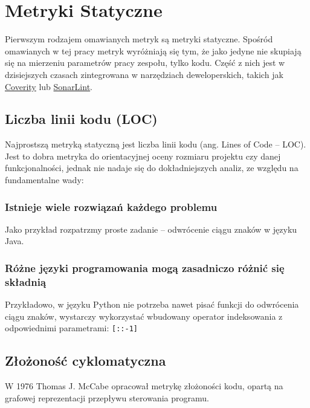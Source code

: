 \newpage
\section{Metryki Statyczne}
Pierwszym rodzajem omawianych metryk są metryki statyczne. Spośród omawianych w tej pracy metryk wyróżniają się tym,
że jako jedyne nie skupiają się na mierzeniu parametrów pracy zespołu, tylko kodu.
Część z nich jest w dzisiejszych czasach zintegrowana w narzędziach deweloperskich, takich jak \href{https://www.synopsys.com/software-integrity/static-analysis-tools-sast/coverity.html}{Coverity}
lub \href{https://www.sonarsource.com/products/sonarlint/}{SonarLint}.

\subsection{Liczba linii kodu (LOC)}
Najprostszą metryką statyczną jest liczba linii kodu (ang. Lines of Code -- LOC).
Jest to dobra metryka do orientacyjnej oceny rozmiaru projektu czy danej funkcjonalności, jednak nie nadaje
się do dokładniejszych analiz, ze względu na fundamentalne wady:

\subsubsection*{Istnieje wiele rozwiązań każdego problemu}
Jako przykład rozpatrzmy proste zadanie -- odwrócenie ciągu znaków w języku Java. \\




\subsubsection*{Różne języki programowania mogą zasadniczo różnić się składnią}
Przykładowo, w języku Python nie potrzeba nawet pisać funkcji do odwrócenia
ciągu znaków, wystarczy wykorzystać wbudowany operator indeksowania z odpowiednimi parametrami: \texttt{[::-1]}

\subsection{Złożoność cyklomatyczna}
W 1976 Thomas J. McCabe opracował metrykę złożoności kodu, opartą na grafowej reprezentacji przepływu sterowania programu\cite[]{McCabe1976ACM}.
